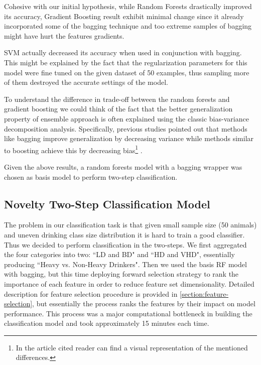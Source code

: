 	Cohesive with our initial hypothesis, while Random Forests drastically improved its accuracy, Gradient Boosting result exhibit minimal change since it already incorporated some of the bagging technique and too extreme samples of bagging might have hurt the features gradients.
	
	SVM actually decreased its accuracy when used in conjunction with bagging. This might be explained by the fact that the regularization parameters for this model were fine tuned on the given dataset of 50 examples, thus sampling more of them destroyed the accurate settings of the model.
	
	To understand the difference in trade-off between the random forests and gradient boosting we could think of the fact that the better generalization property of ensemble approach is often explained using the classic bias-variance decomposition analysis. Specifically, previous studies pointed out that methods like bagging improve generalization by decreasing variance while methods similar to boosting achieve this by decreasing
	bias\footnote{In the article cited reader can find a visual representation of the mentioned differences.} .
		
	Given the above results, a random forests model with a bagging wrapper was chosen as basis model to perform two-step classification.	
	
	\subsection{Novelty Two-Step Classification Model}	
	The problem in our classification task is that given small sample size (50 animals) and uneven drinking class size distribution it is hard to train a good classifier. Thus we decided to perform classification in the two-steps. We first aggregated the four categories into two: ``LD and BD" and ``HD and VHD", essentially producing ``Heavy vs. Non-Heavy Drinkers". Then we used the basis RF model with bagging, but this time deploying forward selection strategy to rank the importance of each feature in order to reduce feature set dimensionality. Detailed description for feature selection procedure is provided in \cref{section:feature-selection}, but  essentially the process ranks the features by their impact on model performance. This process was a major computational bottleneck in building the classification model and took approximately 15 minutes each time. 
	
